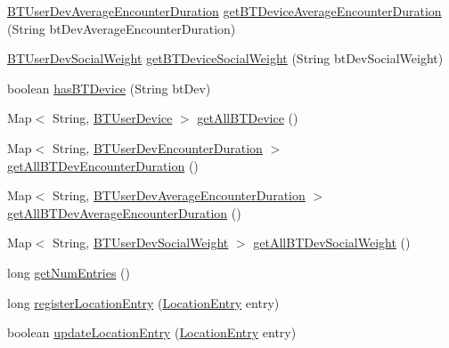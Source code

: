\begin{DoxyCompactItemize}
\item 
\hyperlink{classcs_1_1usense_1_1bluetooth_1_1_b_t_user_dev_average_encounter_duration}{B\+T\+User\+Dev\+Average\+Encounter\+Duration} \hyperlink{classcs_1_1usense_1_1db_1_1_usense_data_source_ade91c6cd3621cc6fd48181b72c03530f}{get\+B\+T\+Device\+Average\+Encounter\+Duration} (String bt\+Dev\+Average\+Encounter\+Duration)
\item 
\hyperlink{classcs_1_1usense_1_1bluetooth_1_1_b_t_user_dev_social_weight}{B\+T\+User\+Dev\+Social\+Weight} \hyperlink{classcs_1_1usense_1_1db_1_1_usense_data_source_a552ef323bbb97e8cd1b440fa513ef1de}{get\+B\+T\+Device\+Social\+Weight} (String bt\+Dev\+Social\+Weight)
\item 
boolean \hyperlink{classcs_1_1usense_1_1db_1_1_usense_data_source_aa8636b1ac08b4d9c0f1a054b84b51223}{has\+B\+T\+Device} (String bt\+Dev)
\item 
Map$<$ String, \hyperlink{classcs_1_1usense_1_1bluetooth_1_1_b_t_user_device}{B\+T\+User\+Device} $>$ \hyperlink{classcs_1_1usense_1_1db_1_1_usense_data_source_ab91b8f4f44080668b3bf54756c1fedfc}{get\+All\+B\+T\+Device} ()
\item 
Map$<$ String, \hyperlink{classcs_1_1usense_1_1bluetooth_1_1_b_t_user_dev_encounter_duration}{B\+T\+User\+Dev\+Encounter\+Duration} $>$ \hyperlink{classcs_1_1usense_1_1db_1_1_usense_data_source_ac3c52fdaefeed93bca2c821bc47230fa}{get\+All\+B\+T\+Dev\+Encounter\+Duration} ()
\item 
Map$<$ String, \hyperlink{classcs_1_1usense_1_1bluetooth_1_1_b_t_user_dev_average_encounter_duration}{B\+T\+User\+Dev\+Average\+Encounter\+Duration} $>$ \hyperlink{classcs_1_1usense_1_1db_1_1_usense_data_source_a9523ea800b620677ca3033848781b695}{get\+All\+B\+T\+Dev\+Average\+Encounter\+Duration} ()
\item 
Map$<$ String, \hyperlink{classcs_1_1usense_1_1bluetooth_1_1_b_t_user_dev_social_weight}{B\+T\+User\+Dev\+Social\+Weight} $>$ \hyperlink{classcs_1_1usense_1_1db_1_1_usense_data_source_a0aef6418bc985e73f9065107d26cf49a}{get\+All\+B\+T\+Dev\+Social\+Weight} ()
\item 
long \hyperlink{classcs_1_1usense_1_1db_1_1_usense_data_source_a88597c44daea873d78983e138ef76c01}{get\+Num\+Entries} ()
\item 
long \hyperlink{classcs_1_1usense_1_1db_1_1_usense_data_source_ac4365c25de9b831d3cd89e13b1f7933c}{register\+Location\+Entry} (\hyperlink{classcs_1_1usense_1_1location_1_1_location_entry}{Location\+Entry} entry)
\item 
boolean \hyperlink{classcs_1_1usense_1_1db_1_1_usense_data_source_aec18fea380d682f4bd249a7c5e4d1679}{update\+Location\+Entry} (\hyperlink{classcs_1_1usense_1_1location_1_1_location_entry}{Location\+Entry} entry)

\end{DoxyCompactItemize}
